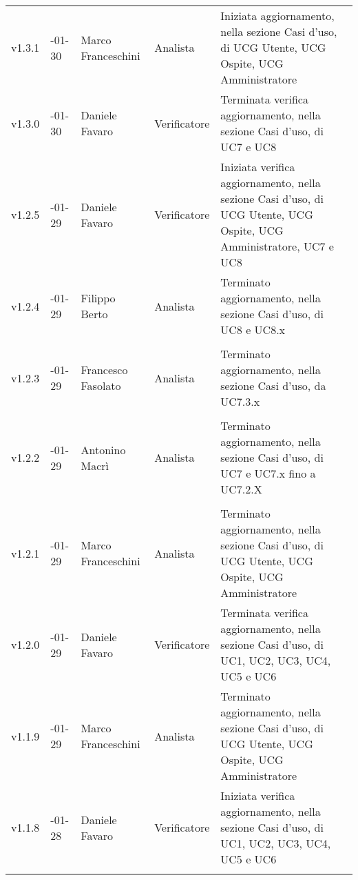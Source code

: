 \begin{longtable} { >{\centering}p{1.4cm} >{\centering}p{2cm} >{\centering}p{2.3cm} >{\centering}p{2.7cm} p{5.5cm} }
		\addlinespace[0.4em]
		\midrule
		\addlinespace[0.4em]
		v1.3.1 & 2017-01-30 & Marco Franceschini & Analista & Iniziata aggiornamento, nella sezione Casi d'uso, di UCG Utente, UCG Ospite, UCG Amministratore \\
		\addlinespace[0.4em]
		\midrule
		\addlinespace[0.4em]
		v1.3.0 & 2017-01-30 &  Daniele Favaro & Verificatore & Terminata verifica aggiornamento, nella sezione Casi d'uso, di UC7 e UC8 \\
		\addlinespace[0.4em]
		\midrule
		\addlinespace[0.4em]
		v1.2.5 & 2017-01-29 & Daniele Favaro & Verificatore & Iniziata verifica aggiornamento, nella sezione Casi d'uso, di UCG Utente, UCG Ospite, UCG Amministratore, UC7 e UC8 \\
		\addlinespace[0.4em]
		\midrule
		\addlinespace[0.4em]
		v1.2.4 & 2017-01-29 & Filippo Berto & Analista & Terminato aggiornamento, nella sezione Casi d'uso, di UC8 e UC8.x \\ \\
		\addlinespace[0.4em]
		\midrule
		\addlinespace[0.4em]
		v1.2.3 & 2017-01-29 & Francesco Fasolato & Analista & Terminato aggiornamento, nella sezione Casi d'uso, da UC7.3.x\\ \\
		\addlinespace[0.4em]
		\midrule
		\addlinespace[0.4em]
		v1.2.2 & 2017-01-29 & Antonino Macrì & Analista & Terminato aggiornamento, nella sezione Casi d'uso, di UC7 e UC7.x fino a UC7.2.X \\ \\
		\addlinespace[0.4em]
		\midrule
		\addlinespace[0.4em]
		v1.2.1 & 2017-01-29 & Marco Franceschini & Analista & Terminato aggiornamento, nella sezione Casi d'uso, di UCG Utente, UCG Ospite, UCG Amministratore \\ 
		\addlinespace[0.4em]
		\midrule
		\addlinespace[0.4em]
		v1.2.0 & 2017-01-29 & Daniele Favaro & Verificatore & Terminata verifica aggiornamento, nella sezione Casi d'uso, di UC1, UC2, UC3, UC4, UC5 e UC6 \\
		\addlinespace[0.4em]
		\midrule
		\addlinespace[0.4em]
		v1.1.9 & 2017-01-29 & Marco Franceschini & Analista & Terminato aggiornamento, nella sezione Casi d'uso, di UCG Utente, UCG Ospite, UCG Amministratore \\
		\addlinespace[0.4em]
		\midrule
		\addlinespace[0.4em]
		v1.1.8 & 2017-01-28 & Daniele Favaro & Verificatore & Iniziata verifica aggiornamento, nella sezione Casi d'uso, di UC1, UC2, UC3, UC4, UC5 e UC6 \\
		\addlinespace[0.4em]
		\midrule
		\addlinespace[0.4em]

\end{longtable}
